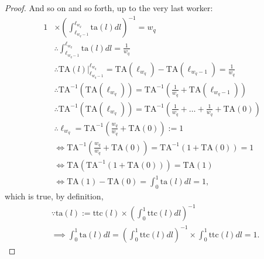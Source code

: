 \documentclass[hidelinks, nonatbib]{elsarticle}
\begin{document}
\begin{lemma}
\begin{proof}
        And so on and so forth, up to the very last worker:
        \begin{align}
        1 
        &\times 
        \left(
            \int_{\ell_{w_q - 1}}^{\ell_{w_q}}
            \text{ta}(l)
            dl
        \right) ^ {-1}
        =
        w_q
        \\
        &\therefore
        \int_{\ell_{w_q - 1}}^{\ell_{w_q}}
        \text{ta}(l)
        dl
        =
        \frac{1}{w_q}
        \\
        &\therefore
        \text{TA}(l)
        \big|_{\ell_{w_q - 1}}^{\ell_{w_q}}
        =
        \text{TA}(\ell_{w_q})
        -
        \text{TA}(\ell_{w_q - 1})
        =
        \frac{1}{w_q}
        \\
        &\therefore
        \text{TA}^{-1}(
            \text{TA}(\ell_{w_q})
        )
        =
        \text{TA}^{-1}\left(
            \frac{1}{w_q}
            +
            \text{TA}(\ell_{w_q - 1})
        \right)
        \\
        &\therefore
        \text{TA}^{-1}(
            \text{TA}(\ell_{w_q})
        )
        =
        \text{TA}^{-1}\left(
            \frac{1}{w_q}
            +
            \dots
            +
            \frac{1}{w_q}
            +
            \text{TA}(0)
        \right)
        \\
        &\therefore
        \ell_{w_q}
        =
        \text{TA}^{-1}\left(
            \frac{w_q}{w_q}
            +
            \text{TA}(0)
        \right)
        := 1
        \\
        &\iff
        \text{TA}^{-1}\left(
            \frac{w_q}{w_q}
            +
            \text{TA}(0)
        \right)
        =
        \text{TA}^{-1}\left(
            1
            +
            \text{TA}(0)
        \right)
        =
        1
        \\
        &\iff
        \text{TA}\left(
            \text{TA}^{-1}\left(
            1
            +
            \text{TA}(0)
        \right)
        \right)
        =
        \text{TA}(1)
        \\
        &\iff
        \text{TA}(1)
        -
        \text{TA}(0)
        =
        \int_{0}^{1}{
            \text{ta}(l)
            dl
        }
        =
        1
        ,
        \end{align}
        which is true, by definition,
        \begin{align}
        &\because
        \text{ta}(l) 
        :=
        \text{ttc}(l)
        \times
        \left(
            \int_{0}^{1}{
                \text{ttc}(l)
                dl
            }
        \right) ^ {-1}
        \\
        &\implies
        \int_{0}^{1}{
            \text{ta}(l)
            dl
        }
        =
        \left(
            \int_{0}^{1}
            \text{ttc}(l)
            dl
        \right) ^ {-1}
        \times
        \int_{0}^{1}{
            \text{ttc}(l)
            dl
        }
        =
        1
        .
        \end{align}
        

\end{proof}
\end{lemma}
\end{document}
